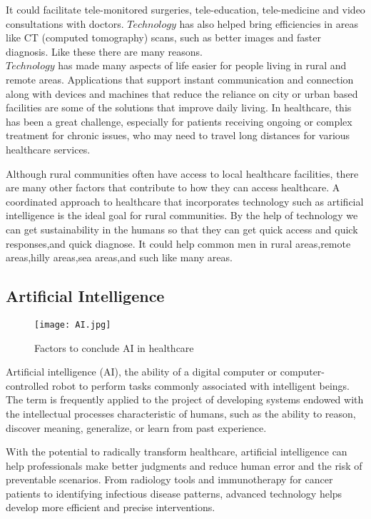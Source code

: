 \documentclass[12pts]{article}
\begin{document}
It could facilitate tele-monitored surgeries, tele-education, tele-medicine and video consultations with doctors.
$Technology$ has also helped bring efficiencies in areas like CT (computed tomography) scans, such as better images and faster diagnosis.
Like these there are many reasons.\\

$Technology$ has made many aspects of life easier for people living in rural and remote areas. Applications that support instant communication and connection along with devices and machines that reduce the reliance on city or urban based facilities are some of the solutions that improve daily living. In healthcare, this has been a great challenge, especially for patients receiving ongoing or complex treatment for chronic issues, who may need to travel long distances for various healthcare services.

Although rural communities often have access to local healthcare facilities, there are many other factors that contribute to how they can access healthcare. A coordinated approach to healthcare that incorporates technology such as artificial intelligence is the ideal goal for rural communities.
By the help of technology we can get sustainability in the humans so that they can get quick access and quick responses,and quick diagnose.
It could help common men in rural areas,remote areas,hilly areas,sea areas,and such like many areas.





\subsection*{Artificial Intelligence}

\begin{figure}[h]
\centering
\texttt{[image: AI.jpg]}
\caption{Factors to conclude AI in healthcare}
\end{figure}

Artificial intelligence (AI), the ability of a digital computer or computer-controlled robot to perform tasks commonly associated with intelligent beings. The term is frequently applied to the project of developing systems endowed with the intellectual processes characteristic of humans, such as the ability to reason, discover meaning, generalize, or learn from past experience.

With the potential to radically transform healthcare, artificial intelligence can help professionals make better judgments and reduce human error and the risk of preventable scenarios. From radiology tools and immunotherapy for cancer patients to identifying infectious disease patterns, advanced technology helps develop more efficient and precise interventions.
\end{document}
